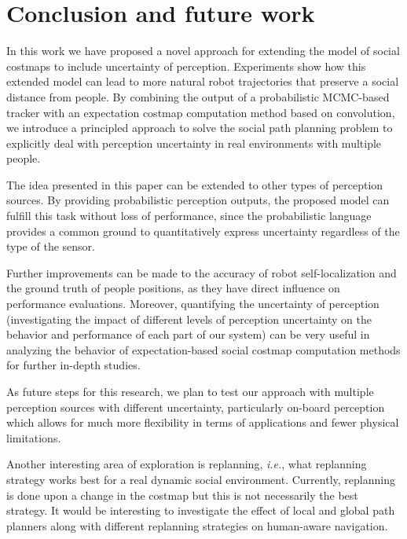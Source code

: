 \section{Conclusion and future work}
\label{sec:conclusion}

In this work we have proposed a novel approach for extending the model of social costmaps to include uncertainty of perception. Experiments show how this extended model can lead to more natural robot trajectories that preserve a social distance from people. By combining the output of a probabilistic MCMC-based tracker with an expectation costmap computation method based on convolution, we introduce a principled approach to solve the social path planning problem to explicitly deal with perception uncertainty in real environments with multiple people. 



The idea presented in this paper can be extended to other types of perception sources. By providing probabilistic perception outputs, the proposed model can fulfill this task without loss of performance, since the probabilistic language provides a common ground to quantitatively express uncertainty regardless of the type of the sensor. 


Further improvements can be made to the accuracy of robot self-localization and the ground truth of people positions, as they have direct influence on performance evaluations. Moreover, quantifying the uncertainty of perception (investigating the impact of different levels of perception uncertainty on the behavior and performance of each part of our system) can be very useful in analyzing the behavior of expectation-based social costmap computation methods for further in-depth studies.


As future steps for this research, we plan to test our approach with multiple perception sources with different uncertainty, particularly on-board perception which allows for much more flexibility in terms of applications and fewer physical limitations.

Another interesting area of exploration is replanning, \textit{i.e.}, what replanning strategy works best for a real dynamic social environment. Currently, replanning is done upon a change in the costmap but this is not necessarily the best strategy. It would be interesting to investigate the effect of local and global path planners along with different replanning strategies on human-aware navigation.  








